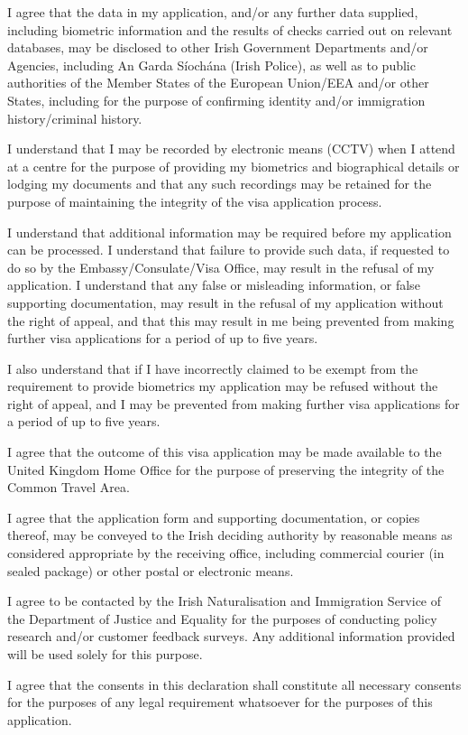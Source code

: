 \documentclass[11pt,a4paper,sans]{moderncv} %
\begin{document}
I agree that the data in my application, and/or any further data supplied, including biometric information and the results of checks carried out on relevant databases, may be disclosed to other Irish Government Departments and/or Agencies, including An Garda S\'{i}och\'{a}na (Irish Police), as well as to public authorities of the Member States of the European Union/EEA and/or other States, including for the purpose of confirming identity and/or immigration history/criminal history.

I understand that I may be recorded by electronic means (CCTV) when I attend at a centre for the purpose of providing my biometrics and biographical details or lodging my documents and that any such recordings may be retained for the purpose of maintaining the integrity of the visa application process.

\newpage

I understand that additional information may be required before my application can be processed. I understand that failure to provide such data, if requested to do so by the Embassy/Consulate/Visa Office, may result in the refusal of my application. I understand that any false or misleading information, or false supporting documentation, may result in the refusal of my application without the right of appeal, and that this may result in me being prevented from making further visa applications for a period of up to five years.

I also understand that if I have incorrectly claimed to be exempt from the requirement to provide biometrics my application may be refused without the right of appeal, and I may be prevented from making further visa applications for a period of up to five years.

I agree that the outcome of this visa application may be made available to the United Kingdom Home Office for the purpose of preserving the integrity of the Common Travel Area.

I agree that the application form and supporting documentation, or copies thereof, may be conveyed to the Irish deciding authority by reasonable means as considered appropriate by the receiving office, including commercial courier (in sealed package) or other postal or electronic means.

I agree to be contacted by the Irish Naturalisation and Immigration Service of the Department of Justice and Equality for the purposes of conducting policy research and/or customer feedback surveys. Any additional information provided will be used solely for this purpose.

I agree that the consents in this declaration shall constitute all necessary consents for the purposes of any legal requirement whatsoever for the purposes of this application.

\makeletterclosing %

\end{document}
